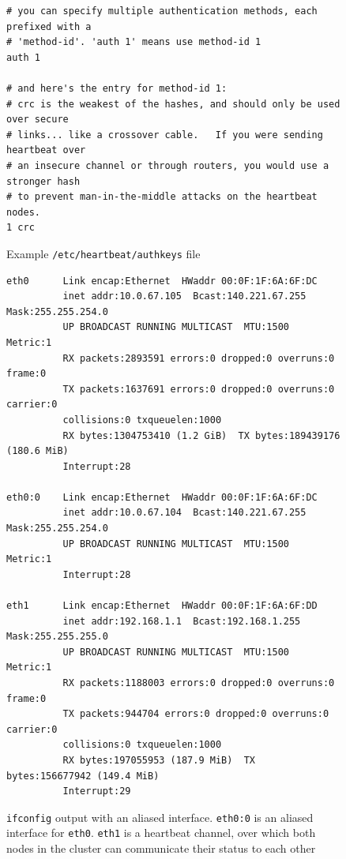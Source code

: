 \documentclass[11pt]{article}
\begin{document}
\begin{figure}
\begin{scriptsize}
\begin{verbatim}
# you can specify multiple authentication methods, each prefixed with a
# 'method-id'. 'auth 1' means use method-id 1
auth 1

# and here's the entry for method-id 1:
# crc is the weakest of the hashes, and should only be used over secure
# links... like a crossover cable.   If you were sending heartbeat over
# an insecure channel or through routers, you would use a stronger hash
# to prevent man-in-the-middle attacks on the heartbeat nodes.
1 crc
\end{verbatim}
\end{scriptsize}
\caption{Example \texttt{/etc/heartbeat/authkeys} file}
\label{fig:authkeys}
\end{figure}

\begin{figure}
\begin{scriptsize}
\begin{verbatim}
eth0      Link encap:Ethernet  HWaddr 00:0F:1F:6A:6F:DC  
          inet addr:10.0.67.105  Bcast:140.221.67.255  Mask:255.255.254.0
          UP BROADCAST RUNNING MULTICAST  MTU:1500  Metric:1
          RX packets:2893591 errors:0 dropped:0 overruns:0 frame:0
          TX packets:1637691 errors:0 dropped:0 overruns:0 carrier:0
          collisions:0 txqueuelen:1000 
          RX bytes:1304753410 (1.2 GiB)  TX bytes:189439176 (180.6 MiB)
          Interrupt:28 

eth0:0    Link encap:Ethernet  HWaddr 00:0F:1F:6A:6F:DC  
          inet addr:10.0.67.104  Bcast:140.221.67.255  Mask:255.255.254.0
          UP BROADCAST RUNNING MULTICAST  MTU:1500  Metric:1
          Interrupt:28 

eth1      Link encap:Ethernet  HWaddr 00:0F:1F:6A:6F:DD  
          inet addr:192.168.1.1  Bcast:192.168.1.255  Mask:255.255.255.0
          UP BROADCAST RUNNING MULTICAST  MTU:1500  Metric:1
          RX packets:1188003 errors:0 dropped:0 overruns:0 frame:0
          TX packets:944704 errors:0 dropped:0 overruns:0 carrier:0
          collisions:0 txqueuelen:1000 
          RX bytes:197055953 (187.9 MiB)  TX bytes:156677942 (149.4 MiB)
          Interrupt:29 
\end{verbatim}
\end{scriptsize}
\caption{\texttt{ifconfig} output with an aliased interface. \texttt{eth0:0} is
an aliased interface for \texttt{eth0}.  \texttt{eth1} is a heartbeat channel,
over which both nodes in the cluster can communicate their status to each
other}
\label{fig:alias}
\end{figure}
\end{document}
